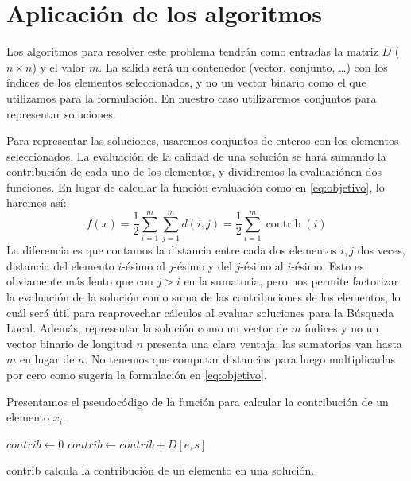 \documentclass{article}
\begin{document}
\pagebreak

\section{Aplicación de los algoritmos}

Los algoritmos para resolver este problema tendrán como entradas la matriz $D$ ($n\times n$) y el valor $m$. La salida será un contenedor
(vector, conjunto, \ldots) con los índices de los elementos seleccionados, y no un vector binario como el que utilizamos para la formulación. En nuestro caso utilizaremos conjuntos para representar soluciones.

Para representar las soluciones, usaremos conjuntos de enteros con los elementos seleccionados. La evaluación de la calidad de una solución se hará
sumando la contribución de cada uno de los elementos, y dividiremos la evaluaciónen dos funciones. En lugar de calcular la función evaluación como en
\eqref{eq:objetivo}, lo haremos así:
\begin{equation} \label{eq:objetivo-fact}
f(x)=\frac{1}{2}\sum_{i=1}^{m}\sum_{j=1}^m d(i,j)=\frac{1}{2}\sum_{i=1}^{m}\operatorname{contrib}(i)
\end{equation}
La diferencia es que contamos la distancia entre cada dos elementos $i,j$ dos veces, distancia del elemento $i$-ésimo al $j$-ésimo y del $j$-ésimo al
$i$-ésimo. Esto es obviamente más lento que con $j>i$ en la sumatoria, pero nos permite factorizar la evaluación de la solución como suma de las
 contribuciones de los elementos, lo cuál será útil para reaprovechar cálculos al evaluar soluciones para la Búsqueda Local.
 Además, representar la solución como un vector de $m$ índices y no un vector binario de longitud $n$ presenta una clara ventaja: las sumatorias van hasta
 $m$ en lugar de $n$. No tenemos que computar distancias para luego multiplicarlas por cero como sugería la formulación en \eqref{eq:objetivo}.

Presentamos el pseudocódigo de la función para calcular la contribución de un elemento $x_i$.
\begin{algorithm}
	\DontPrintSemicolon %
	$contrib \gets 0$\;
	 {
		$contrib \gets contrib + D[e,s]$ 
	}
	\;
	\caption{{\sc contrib} calcula la contribución de un elemento en una solución.}
	\label{alg:contrib}
\end{algorithm}
\end{document}
